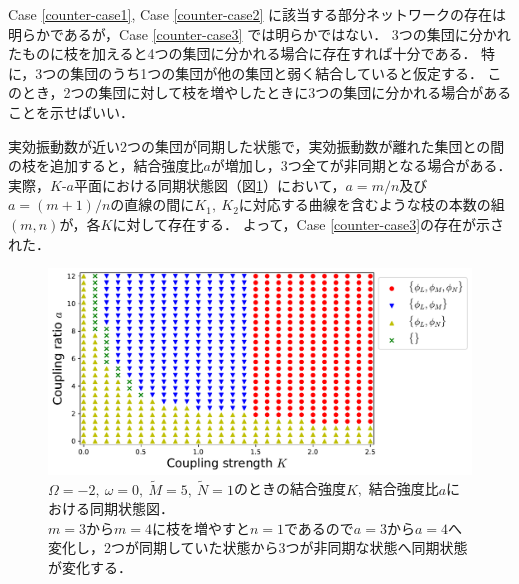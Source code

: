 \documentclass[../main]{subfiles}
\begin{document}
Case \ref{counter-case1}, Case \ref{counter-case2} に該当する部分ネットワークの存在は明らかであるが，Case \ref{counter-case3} では明らかではない．
3つの集団に分かれたものに枝を加えると4つの集団に分かれる場合に存在すれば十分である．
特に，3つの集団のうち1つの集団が他の集団と弱く結合していると仮定する．
このとき，2つの集団に対して枝を増やしたときに3つの集団に分かれる場合があることを示せばいい．

実効振動数が近い2つの集団が同期した状態で，実効振動数が離れた集団との間の枝を追加すると，結合強度比$a$が増加し，3つ全てが非同期となる場合がある．
実際，$K$-$a$平面における同期状態図（図\ref{fig:3body-phase-m5}）において，$a=m/n$及び$a=(m+1)/n$の直線の間に$K_1,\ K_2$に対応する曲線を含むような枝の本数の組$(m,n)$が，各$K$に対して存在する．
よって，Case \ref{counter-case3}の存在が示された．

\begin{figure}[tbp]
    \centering
    \includegraphics[width=135mm]{./images/three-body-phase-m5.pdf}
    \centering
    \caption{$\Omega=-2,\ \omega=0,\ \tilde{M}=5,\ \tilde{N}=1$のときの結合強度$K$,\ 結合強度比$a$における同期状態図．\\
    $m=3$から$m=4$に枝を増やすと$n=1$であるので$a=3$から$a=4$へ変化し，2つが同期していた状態から3つが非同期な状態へ同期状態が変化する．}
    \label{fig:3body-phase-m5}
\end{figure}

\end{document}
